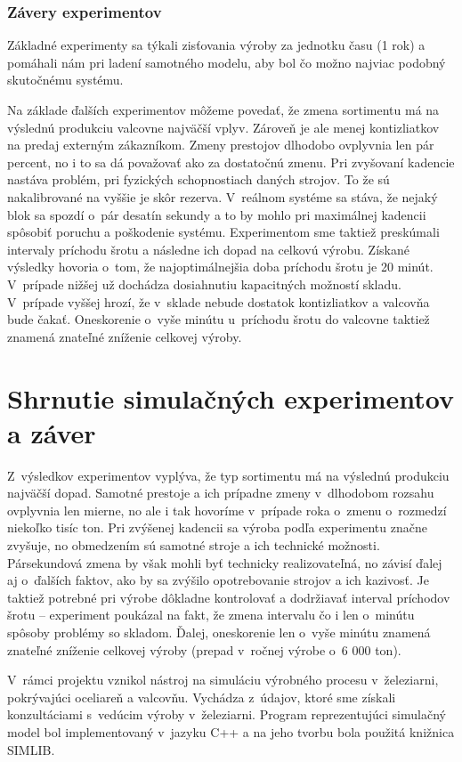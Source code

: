 \documentclass[]{article}
\begin{document}
\subsubsection{Závery experimentov}
Základné experimenty sa týkali zisťovania výroby za jednotku času (1 rok) a pomáhali nám pri ladení samotného modelu, aby bol čo možno najviac podobný skutočnému systému.

Na základe ďalších experimentov môžeme povedať, že zmena sortimentu má na výslednú produkciu valcovne najväčší vplyv. Zároveň je ale menej kontizliatkov na predaj externým zákazníkom. Zmeny prestojov dlhodobo ovplyvnia len pár percent, no i to sa dá považovať ako za dostatočnú zmenu. Pri zvyšovaní kadencie nastáva problém, pri fyzických schopnostiach daných strojov. To že sú nakalibrované na vyššie je skôr rezerva. V~reálnom systéme sa stáva, že nejaký blok sa spozdí o~pár desatín sekundy a to by mohlo pri maximálnej kadencii spôsobiť poruchu a poškodenie systému. Experimentom sme taktiež preskúmali intervaly príchodu šrotu a následne ich dopad na celkovú výrobu. Získané výsledky hovoria o~tom, že najoptimálnejšia doba príchodu šrotu je 20 minút. V~prípade nižšej už dochádza dosiahnutiu kapacitných možností skladu. V~prípade vyššej hrozí, že v~sklade nebude dostatok kontizliatkov a valcovňa bude čakať. Oneskorenie o~vyše minútu u~príchodu šrotu do valcovne taktiež znamená znateľné zníženie celkovej výroby.

\section{Shrnutie simulačných experimentov a záver}
Z~výsledkov experimentov vyplýva, že typ sortimentu má na výslednú produkciu najväčší dopad. Samotné prestoje a ich prípadne zmeny v~dlhodobom rozsahu ovplyvnia len mierne, no ale i tak hovoríme v~prípade roka o~zmenu o~rozmedzí niekoľko tisíc ton. Pri zvýšenej kadencii sa výroba podľa experimentu značne zvyšuje, no obmedzením sú samotné stroje a ich technické možnosti. Pársekundová zmena by však mohli byť technicky realizovateľná, no závisí ďalej aj o~ďalších faktov, ako by sa zvýšilo opotrebovanie strojov a ich kazivosť. Je taktiež potrebné pri výrobe dôkladne kontrolovať a dodržiavať interval príchodov šrotu -- experiment poukázal na fakt, že zmena intervalu čo i len o~minútu spôsoby problémy so skladom. Ďalej, oneskorenie len o~vyše minútu znamená znateľné zníženie celkovej výroby (prepad v~ročnej výrobe o~6 000 ton).

V~rámci projektu vznikol nástroj na simuláciu výrobného procesu v~železiarni, pokrývajúci oceliareň a valcovňu. Vychádza z~údajov, ktoré sme získali konzultáciami s~vedúcim výroby v~železiarni. Program reprezentujúci simulačný model bol implementovaný v~jazyku C++ a na jeho tvorbu bola použitá knižnica SIMLIB.
\end{document}
